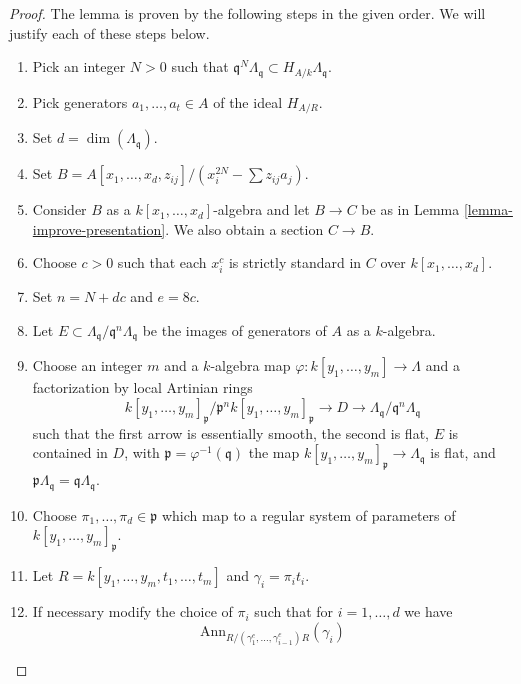 \begin{proof}
The lemma is proven by the following steps in the given order.
We will justify each of these steps below.
\begin{enumerate}
\item
\label{item-power}
Pick an integer $N > 0$ such that
$\mathfrak q^N\Lambda_\mathfrak q \subset H_{A/k}\Lambda_\mathfrak q$.
\item
\label{item-generators}
Pick generators $a_1, \ldots, a_t \in A$ of the ideal $H_{A/R}$.
\item
\label{item-dimension}
Set $d = \dim(\Lambda_\mathfrak q)$.
\item
\label{item-standardizer}
Set $B = A[x_1, \ldots, x_d, z_{ij}]/(x_i^{2N} - \sum z_{ij}a_j)$.
\item
\label{item-elkik}
Consider $B$ as a $k[x_1, \ldots, x_d]$-algebra and let
$B \to C$ be as in
Lemma \ref{lemma-improve-presentation}.
We also obtain a section $C \to B$.
\item
\label{item-strictly-standard}
Choose $c > 0$ such that each $x_i^c$
is strictly standard in $C$ over $k[x_1, \ldots, x_d]$.
\item
\label{item-set-n}
Set $n = N + dc$ and $e = 8c$.
\item
\label{item-set-E}
Let $E \subset \Lambda_\mathfrak q/\mathfrak q^n\Lambda_\mathfrak q$
be the images of generators of $A$ as a $k$-algebra.
\item
\label{item-NP}
Choose an integer $m$ and a $k$-algebra map
$\varphi : k[y_1, \ldots, y_m] \to \Lambda$
and a factorization by local Artinian rings
$$
k[y_1, \ldots, y_m]_\mathfrak p/\mathfrak p^n k[y_1, \ldots, y_m]_\mathfrak p
\to D \to
\Lambda_\mathfrak q/\mathfrak q^n\Lambda_\mathfrak q
$$
such that the first arrow is essentially smooth, the second is flat,
$E$ is contained in $D$, with $\mathfrak p = \varphi^{-1}(\mathfrak q)$
the map $k[y_1, \ldots, y_m]_\mathfrak p \to \Lambda_\mathfrak q$ is
flat, and $\mathfrak p \Lambda_\mathfrak q = \mathfrak q \Lambda_\mathfrak q$.
\item
\label{item-choose-pii}
Choose $\pi_1, \ldots, \pi_d \in \mathfrak p$ which map to a
regular system of parameters of $k[y_1, \ldots, y_m]_\mathfrak p$.
\item
\label{item-set-R}
Let $R = k[y_1, \ldots, y_m, t_1, \ldots, t_m]$ and $\gamma_i = \pi_i t_i$.
\item
\label{item-modify-pii}
If necessary modify the choice of $\pi_i$ such that
for $i = 1, \ldots, d$ we have 
$$
\text{Ann}_{R/(\gamma_1^e, \ldots, \gamma_{i - 1}^e)R}(\gamma_i)
$$
\end{enumerate}
\end{proof}
